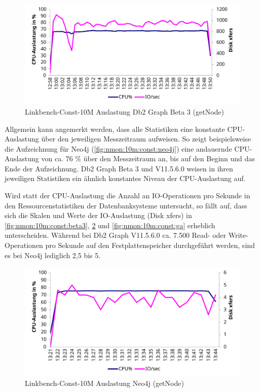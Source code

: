 \begin{figure}[!ht]
    \centering
    \includegraphics[width=\textwidth]{images/stats/linkbench-10m-const_beta3.pdf}
    \caption{Linkbench-Const-10M Auslastung Db2 Graph Beta 3 (getNode)}
    \label{fig:nmon:10m:const:beta3}
\end{figure}

Allgemein kann angemerkt werden, dass alle Statistiken eine konstante CPU-Auslastung über den jeweiligen Messzeitraum aufweisen. So zeigt beispielsweise die Aufzeichnung für Neo4j (\autoref{fig:nmon:10m:const:neo4j}) eine andauernde CPU-Auslastung von ca. 76 \% über den Messzeitraum an, bis auf den Beginn und das Ende der Aufzeichnung. Db2 Graph Beta 3 und V11.5.6.0 weisen in ihren jeweiligen Statistiken ein ähnlich konstantes Niveau der CPU-Auslastung auf. 

Wird statt der CPU-Auslastung die Anzahl an IO-Ope\-ra\-ti\-on\-en pro Sekunde in den Ressourcenstatistiken der Datenbanksysteme untersucht, so fällt auf, dass sich die Skalen und Werte der IO-Aus\-last\-ung (Disk xfers) in \autoref{fig:nmon:10m:const:beta3}, \ref{fig:nmon:10m:const:neo4j} und \ref{fig:nmon:10m:const:ga} erheblich unterscheiden. Während bei Db2 Graph V11.5.6.0 ca. 7.500 Read- oder Write-Ope\-ra\-ti\-on\-en pro Sekunde auf den Festplattenspeicher durchgeführt werden, sind es bei Neo4j lediglich 2,5 bis 5. 

\begin{figure}[!ht]
    \centering
    \includegraphics[width=\textwidth]{images/stats/linkbench-10m-const_neo4j.pdf}
    \caption{Linkbench-Const-10M Auslastung Neo4j (getNode)}
    \label{fig:nmon:10m:const:neo4j}
\end{figure}

